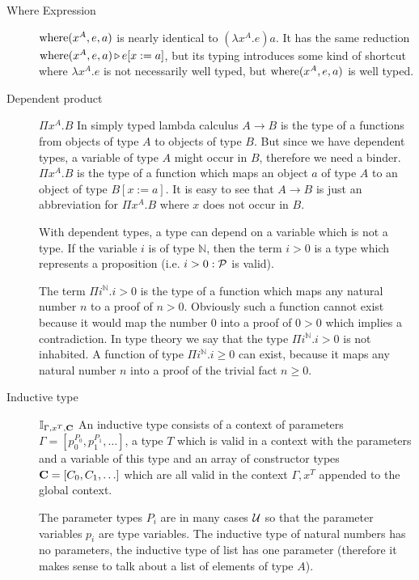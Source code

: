 \begin{description}
\item[Where Expression]
    $\text{where}(x^A,e,a)$ is nearly identical to $(\lambda x^A.e) a$. It has the
    same reduction $\text{where}(x^A,e,a) {\,\triangleright\,} e[x:=a]$, but its typing introduces
    some kind of shortcut where $\lambda x^A.e$ is not necessarily well typed,
    but $\text{where}(x^A,e,a)$ is well typed.

\item[Dependent product] $\Pi x^A.B$ In simply typed lambda calculus
  $A \to B$ is the type of a functions from objects of type $A$ to objects of
  type $B$. But since we have dependent types, a variable of type $A$ might
  occur in $B$, therefore we need a binder. $\Pi x^A. B$ is the type of a
  function which maps an object $a$ of type $A$ to an object of type
  $B[x:=a]$. It is easy to see that $A \to B$ is just an abbreviation for
  $\Pi x^A.B$ where $x$ does not occur in $B$.

  With dependent types, a type can depend on a variable which is not a
  type. If the variable $i$ is of type $\mathbb{N}$, then the term $i > 0$ is
  a type which represents a proposition (i.e. $i > 0: {\cal{P}}$ is valid).

  The term $\Pi i^{\mathbb{N}}. i > 0$ is the type of a function which maps
  any natural number $n$ to a proof of $n > 0$. Obviously such a function
  cannot exist because it would map the number $0$ into a proof of $0 > 0$
  which implies a contradiction. In type theory we say that the type
  $\Pi i^{\mathbb{N}}. i > 0$ is not inhabited. A function of type
  $\Pi i^{\mathbb{N}}. i \ge 0$ can exist, because it maps any natural number
  $n$ into a proof of the trivial fact $n \ge 0$.

\item[Inductive type] $\mathbb{I}_{\Gamma,x^T,\mathbf{C}}$ An inductive type
  consists of a context of parameters
  $\Gamma = [p_0^{P_0}, p_1^{P_1}, \ldots]$, a type $T$ which is valid in a
  context with the parameters and a variable of this type and an array of
  constructor types $\mathbf{C} = [C_0, C_1, \ldots]$ which are all valid in the
  context $\Gamma, x^T$ appended to the global context.

  The parameter types $P_i$ are in many cases ${\cal{U}}$ so that the parameter
  variables $p_i$ are type variables. The inductive type of natural numbers has
  no parameters, the inductive type of list has one parameter (therefore it
  makes sense to talk about a list of elements of type $A$).


\end{description}
